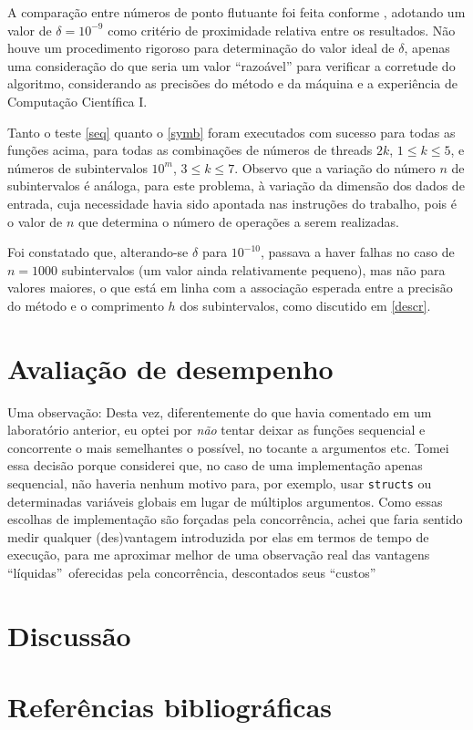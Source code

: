 \documentclass{article}
\begin{document}
  A comparação entre números de ponto flutuante foi feita conforme \cite{float}, adotando um valor de $\delta = 10^{-9}$ como critério de proximidade relativa entre os resultados. Não houve um procedimento rigoroso para determinação do valor ideal de $\delta$, apenas uma consideração do que seria um valor ``razoável'' para verificar a corretude do algoritmo, considerando as precisões do método e da máquina e a experiência de Computação Científica I. 
  
  Tanto o teste \ref{seq} quanto o \ref{symb} foram executados com sucesso para todas as funções acima, para todas as combinações de números de threads $2k$, $1 \leq k \leq 5$, e números de subintervalos $10^m$, $3 \leq k \leq 7$. Observo que a variação do número $n$ de subintervalos é análoga, para este problema, à variação da dimensão dos dados de entrada, cuja necessidade havia sido apontada nas instruções do trabalho, pois é o valor de $n$ que determina o número de operações a serem realizadas.
  
  Foi constatado que, alterando-se $\delta$ para $10^{-10}$, passava a haver falhas no caso de $n = 1000$ subintervalos (um valor ainda relativamente pequeno), mas não para valores maiores, o que está em linha com a associação esperada entre a precisão do método e o comprimento $h$ dos subintervalos, como discutido em \ref{descr}.

  \section{Avaliação de desempenho} \label{perf}

  Uma observação: Desta vez, diferentemente do que havia comentado em um laboratório anterior, eu optei por \emph{não} tentar deixar as funções sequencial e concorrente o mais semelhantes o possível, no tocante a argumentos etc. Tomei essa decisão porque considerei que, no caso de uma implementação apenas sequencial, não haveria nenhum motivo para, por exemplo, usar \texttt{structs} ou determinadas variáveis globais em lugar de múltiplos argumentos. Como essas escolhas de implementação são forçadas pela concorrência, achei 
  que faria sentido medir qualquer (des)vantagem introduzida por elas 
  em termos de tempo de execução, para me aproximar melhor de uma 
  observação real das vantagens ``líquidas''\ oferecidas pela concorrência, descontados seus ``custos''


  \section{Discussão} \label{disc}

  \section{Referências bibliográficas} \label{bibl}

  \printbibliography
\end{document}
